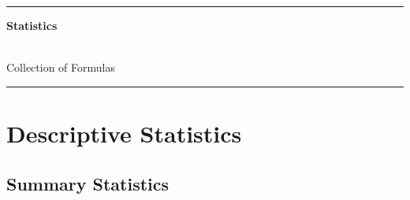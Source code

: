 \documentclass[8pt]{extarticle}
\begin{document}
\vspace*{18em}

\hrule
\begin{center}
{\fontsize{30}{60}\selectfont \textbf{Statistics}} \\ \

{\fontsize{20}{60}\selectfont Collection of Formulas}
\end{center}
\hrule

\tableofcontents




\raggedright %
\setlength{\parindent}{15pt} %
\setlength{\columnseprule}{0.3pt} %








\section{Descriptive Statistics}


\subsection{Summary Statistics}
\end{document}
